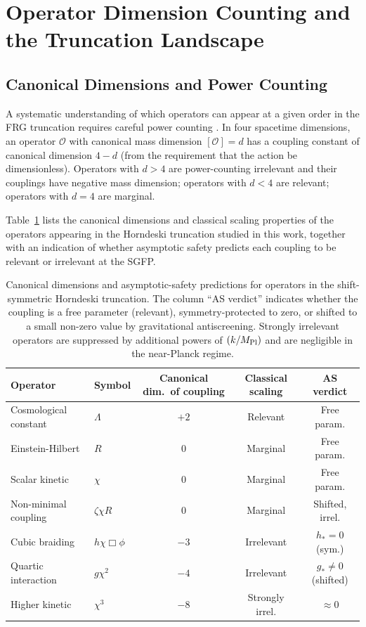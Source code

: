 \documentclass[12pt,a4paper]{article}
\begin{document}
\section{Operator Dimension Counting and the Truncation Landscape}

\subsection{Canonical Dimensions and Power Counting}

A systematic understanding of which operators can appear at a given order in the
FRG truncation requires careful power counting \cite{WilsonKogut1974,Polchinski1984,
Peskin1995}. In four spacetime dimensions, an operator $\mathcal{O}$ with
canonical mass dimension $[\mathcal{O}] = d$ has a coupling constant of canonical
dimension $4 - d$ (from the requirement that the action be dimensionless). Operators
with $d > 4$ are power-counting irrelevant and their couplings have negative mass
dimension; operators with $d < 4$ are relevant; operators with $d = 4$ are marginal.

Table~\ref{tab:operators} lists the canonical dimensions and classical scaling
properties of the operators appearing in the Horndeski truncation studied in
this work, together with an indication of whether asymptotic safety predicts each
coupling to be relevant or irrelevant at the SGFP.

\begin{table}[h]
\centering
\renewcommand{\arraystretch}{1.4}
\begin{tabular}{llccc}
\toprule
Operator & Symbol & Canonical dim.\ of coupling & Classical scaling & AS verdict \\
\midrule
Cosmological constant & $\Lambda$ & $+2$ & Relevant & Free param. \\
Einstein-Hilbert & $R$ & $0$ & Marginal & Free param. \\
Scalar kinetic & $\chi$ & $0$ & Marginal & Free param. \\
Non-minimal coupling & $\zeta\chi R$ & $0$ & Marginal & Shifted, irrel. \\
Cubic braiding & $h\chi\Box\phi$ & $-3$ & Irrelevant & $h_* = 0$ (sym.) \\
Quartic interaction & $g\chi^2$ & $-4$ & Irrelevant & $g_* \neq 0$ (shifted) \\
Higher kinetic & $\chi^3$ & $-8$ & Strongly irrel. & $\approx 0$ \\
\bottomrule
\end{tabular}
\caption{Canonical dimensions and asymptotic-safety predictions for operators
in the shift-symmetric Horndeski truncation. The column ``AS verdict'' indicates
whether the coupling is a free parameter (relevant), symmetry-protected to zero,
or shifted to a small non-zero value by gravitational antiscreening.
Strongly irrelevant operators are suppressed by additional powers of
$(k/M_{\rm Pl})$ and are negligible in the near-Planck regime.}
\label{tab:operators}
\end{table}
\end{document}

